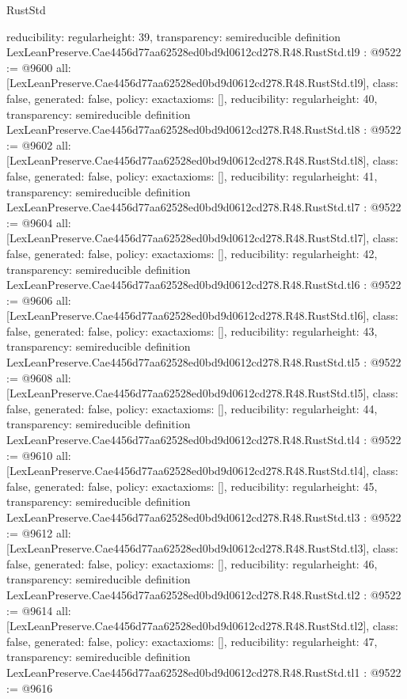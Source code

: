 \begin{lexlean}{RustStd}
\begin{coremodule}
{  reducibility: regular{height: 39},
  transparency: semireducible
}
definition LexLeanPreserve.Cae4456d77aa62528ed0bd9d0612cd278.R48.RustStd.tl9 : @9522 := @9600 {
  all: [LexLeanPreserve.Cae4456d77aa62528ed0bd9d0612cd278.R48.RustStd.tl9],
  class: false,
  generated: false,
  policy: exact{axioms: []},
  reducibility: regular{height: 40},
  transparency: semireducible
}
definition LexLeanPreserve.Cae4456d77aa62528ed0bd9d0612cd278.R48.RustStd.tl8 : @9522 := @9602 {
  all: [LexLeanPreserve.Cae4456d77aa62528ed0bd9d0612cd278.R48.RustStd.tl8],
  class: false,
  generated: false,
  policy: exact{axioms: []},
  reducibility: regular{height: 41},
  transparency: semireducible
}
definition LexLeanPreserve.Cae4456d77aa62528ed0bd9d0612cd278.R48.RustStd.tl7 : @9522 := @9604 {
  all: [LexLeanPreserve.Cae4456d77aa62528ed0bd9d0612cd278.R48.RustStd.tl7],
  class: false,
  generated: false,
  policy: exact{axioms: []},
  reducibility: regular{height: 42},
  transparency: semireducible
}
definition LexLeanPreserve.Cae4456d77aa62528ed0bd9d0612cd278.R48.RustStd.tl6 : @9522 := @9606 {
  all: [LexLeanPreserve.Cae4456d77aa62528ed0bd9d0612cd278.R48.RustStd.tl6],
  class: false,
  generated: false,
  policy: exact{axioms: []},
  reducibility: regular{height: 43},
  transparency: semireducible
}
definition LexLeanPreserve.Cae4456d77aa62528ed0bd9d0612cd278.R48.RustStd.tl5 : @9522 := @9608 {
  all: [LexLeanPreserve.Cae4456d77aa62528ed0bd9d0612cd278.R48.RustStd.tl5],
  class: false,
  generated: false,
  policy: exact{axioms: []},
  reducibility: regular{height: 44},
  transparency: semireducible
}
definition LexLeanPreserve.Cae4456d77aa62528ed0bd9d0612cd278.R48.RustStd.tl4 : @9522 := @9610 {
  all: [LexLeanPreserve.Cae4456d77aa62528ed0bd9d0612cd278.R48.RustStd.tl4],
  class: false,
  generated: false,
  policy: exact{axioms: []},
  reducibility: regular{height: 45},
  transparency: semireducible
}
definition LexLeanPreserve.Cae4456d77aa62528ed0bd9d0612cd278.R48.RustStd.tl3 : @9522 := @9612 {
  all: [LexLeanPreserve.Cae4456d77aa62528ed0bd9d0612cd278.R48.RustStd.tl3],
  class: false,
  generated: false,
  policy: exact{axioms: []},
  reducibility: regular{height: 46},
  transparency: semireducible
}
definition LexLeanPreserve.Cae4456d77aa62528ed0bd9d0612cd278.R48.RustStd.tl2 : @9522 := @9614 {
  all: [LexLeanPreserve.Cae4456d77aa62528ed0bd9d0612cd278.R48.RustStd.tl2],
  class: false,
  generated: false,
  policy: exact{axioms: []},
  reducibility: regular{height: 47},
  transparency: semireducible
}
definition LexLeanPreserve.Cae4456d77aa62528ed0bd9d0612cd278.R48.RustStd.tl1 : @9522 := @9616 {
}
\end{coremodule}
\end{lexlean}
